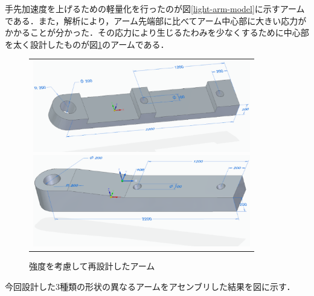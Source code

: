 手先加速度を上げるための軽量化を行ったのが図\ref{light-arm-model}に示すアームである．また，解析により，アーム先端部に比べてアーム中心部に大きい応力がかかることが分かった．その応力により生じるたわみを少なくするために中心部を太く設計したものが図\ref{strong-arm-model}のアームである．

\begin{figure}[htbp]
  \begin{center}
    \begin{tabular}{c}
          \begin{minipage}{0.45\hsize}
        \begin{center}
        \includegraphics[height=4.0cm]{img/eps/light-arm-model.eps}
        \caption{手先加速度をあげるために再設計したアーム}
        \label{light-arm-model}
        \end{center}
      \end{minipage}
      \begin{minipage}{0.55\hsize}
        \begin{center}
          \includegraphics[height=4.0cm]{img/eps/strong-arm-model.eps}
          \caption{強度を考慮して再設計したアーム}
          \label{strong-arm-model}
        \end{center}
      \end{minipage}
    \end{tabular}
  \end{center}
\end{figure}

今回設計した3種類の形状の異なるアームをアセンブリした結果を図\label{3-arm}に示す．

